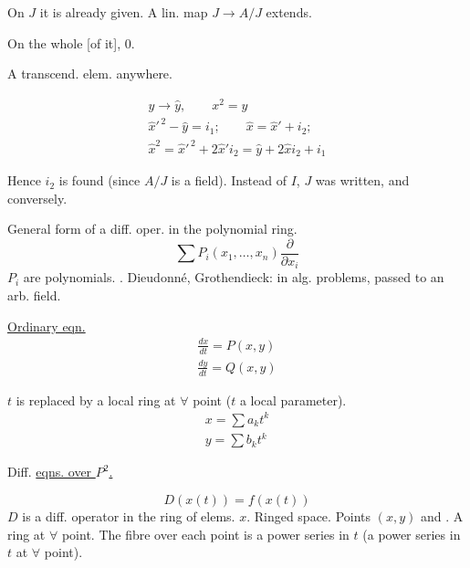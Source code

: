 On $J$ it is already given.
A lin. map $J\to A/J$ extends.
\par
On the whole [of it], $0$.
\par
A transcend. elem. anywhere.
\par\noindent\begin{minipage}{\linewidth}
\begin{gather*}
y\to\hat y,\qquad x^2=y\\
\hat x'^{\,2}-\hat y=i_1;\qquad
\hat x=\hat x'+i_2;\\
\hat x^2=\hat x'^{\,2}+2\hat x'i_2
=\hat y+2\hat xi_2+i_1
\end{gather*}
\end{minipage}\par
Hence $i_2$ is found (since $A/J$ is a field).
Instead of $I$, $J$ was written, and conversely.
\par\medskip{\centering\rule{12mm}{.45pt}\enspace$\cdot$\enspace\rule{15mm}{.45pt}\par}\medskip
General form of a diff. oper. in the polynomial ring.
\begin{equation*}
\sum P_i(x_1,\ldots,x_n)\frac{\partial}{\partial x_i}
\end{equation*}
$P_i$ are polynomials.
 .
Dieudonn\'e, Grothendieck: in alg. problems, passed to an arb. field.
\par\noindent\begin{minipage}{\linewidth}
\underline{Ordinary eqn.}
\begin{gather*}
\frac{dx}{dt}=P(x,y)\\
\frac{dy}{dt}=Q(x,y)
\end{gather*}
\end{minipage}\par
$t$ is replaced by a local ring at $\forall$ point ($t$ a local parameter).
\begin{gather*}
x=\sum a_k t^k\\
y=\sum b_k t^k
\end{gather*}
\par\noindent\begin{minipage}{\linewidth}
Diff. \underline{eqns. over $P^2$.}
\end{minipage}\par
\begin{equation*}
D(x(t))=f(x(t))
\end{equation*}
$D$ is a diff. operator in the ring of elems. $x$.
Ringed space. Points $(x,y)$ and .
A ring at $\forall$ point.
The fibre over each point is a power series in $t$
(a power series in $t$ at $\forall$ point).

